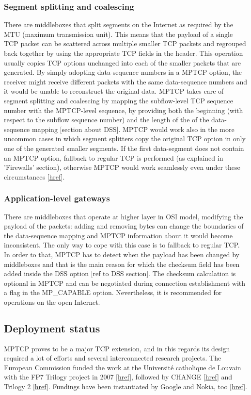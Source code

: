 \subsubsection{Segment splitting and coalescing}
There are middleboxes that split segments on the Internet as required by the MTU (maximum transmission unit). This means that the payload of a single TCP packet can be scattered across multiple smaller TCP packets and regrouped back together by using the appropriate TCP fields in the header. This operation usually copies TCP options unchanged into each of the smaller packets that are generated. By simply adopting data-sequence numbers in a MPTCP option, the receiver might receive different packets with the same data-sequence numbers and it would be unable to reconstruct the original data. MPTCP takes care of segment splitting and coalescing by mapping the subflow-level TCP sequence number with the MPTCP-level sequence, by providing both the beginning (with respect to the subflow sequence number) and the length of the of the data-sequence mapping [section about DSS].
MPTCP would work also in the more uncommon cases in which segment splitters copy the original TCP option in only one of the generated smaller segments. If the first data-segment does not contain an MPTCP option, fallback to regular TCP is performed (as explained in 'Firewalls' section), otherwise MPTCP would work seamlessly even under these circumstances [\href{http://conferences.sigcomm.org/co-next/2013/workshops/HotMiddlebox/program/p37.pdf}{href}].

\subsubsection{Application-level gateways}
There are middleboxes that operate at higher layer in OSI model, modifying the payload of the packets: adding and removing bytes can change the boundaries of the data-sequence mapping and MPTCP information about it would become inconsistent. The only way to cope with this case is to fallback to regular TCP. In order to that, MPTCP has to detect when the payload has been changed by middleboxes and that is the main reason for which the checksum field has been added inside the DSS option [ref to DSS section]. The checksum calculation is optional in MPTCP and can be negotiated during connection establishment with a flag in the MP\_CAPABLE option. Nevertheless, it is recommended for operations on the open Internet.


\subsection{Deployment status}
MPTCP proves to be a major TCP extension, and in this regards its design required a lot of efforts and several interconnected research projects. The European Commission funded the work at the Université catholique de Louvain with the FP7 Trilogy project in 2007 [\href{http://www.trilogy-project.org/}{href}], followed by CHANGE [\href{http://www.change-project.eu/}{href}] and Trilogy 2 [\href{http://trilogy2.it.uc3m.es/}{href}]. Fundings have been instantiated by Google and Nokia, too [\href{https://multipath-tcp.org/pmwiki.php}{href}]. 

